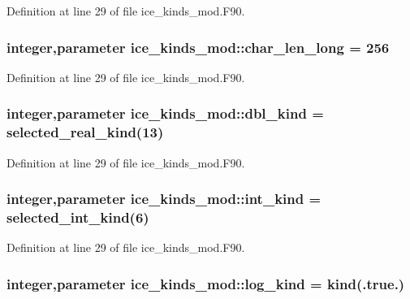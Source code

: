 Definition at line 29 of file ice\_\-kinds\_\-mod.F90.\hypertarget{namespaceice__kinds__mod_ac0e6e7d330377449d5a1ad6fa9fc6a31}{
\subsubsection[{char\_\-len\_\-long}]{\setlength{\rightskip}{0pt plus 5cm}integer,parameter {\bf ice\_\-kinds\_\-mod::char\_\-len\_\-long} = 256}}
\label{namespaceice__kinds__mod_ac0e6e7d330377449d5a1ad6fa9fc6a31}


Definition at line 29 of file ice\_\-kinds\_\-mod.F90.\hypertarget{namespaceice__kinds__mod_af54ee31a38380cc4f477ba152ffef7d5}{
\subsubsection[{dbl\_\-kind}]{\setlength{\rightskip}{0pt plus 5cm}integer,parameter {\bf ice\_\-kinds\_\-mod::dbl\_\-kind} = selected\_\-real\_\-kind(13)}}
\label{namespaceice__kinds__mod_af54ee31a38380cc4f477ba152ffef7d5}


Definition at line 29 of file ice\_\-kinds\_\-mod.F90.\hypertarget{namespaceice__kinds__mod_aeda5fd1eefedcb096b1929d3c2ed46c8}{
\subsubsection[{int\_\-kind}]{\setlength{\rightskip}{0pt plus 5cm}integer,parameter {\bf ice\_\-kinds\_\-mod::int\_\-kind} = selected\_\-int\_\-kind(6)}}
\label{namespaceice__kinds__mod_aeda5fd1eefedcb096b1929d3c2ed46c8}


Definition at line 29 of file ice\_\-kinds\_\-mod.F90.\hypertarget{namespaceice__kinds__mod_aed396721758f7c268c34a610f26a5feb}{
\subsubsection[{log\_\-kind}]{\setlength{\rightskip}{0pt plus 5cm}integer,parameter {\bf ice\_\-kinds\_\-mod::log\_\-kind} = kind(.true.)}}
\label{namespaceice__kinds__mod_aed396721758f7c268c34a610f26a5feb}


